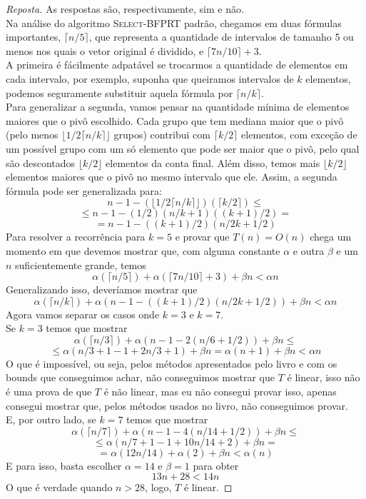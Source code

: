 \documentclass[12pt]{article}
\begin{document}
\begin{proof}[Reposta]
As respostas são, respectivamente, sim e não. \\
Na análise do algoritmo \textsc{Select-BFPRT} padrão, chegamos em duas fórmulas importantes, $\lceil n/5 \rceil$, que representa a quantidade de intervalos de tamanho 5 ou menos nos quais o vetor original é dividido, e $\lceil 7n/10 \rceil + 3$. \\ 
A primeira é fácilmente adpatável se trocarmos a quantidade de elementos em cada intervalo, por exemplo, suponha que queiramos intervalos de $k$ elementos, podemos seguramente substituir aquela fórmula por $\lceil n/k \rceil$. \\
Para generalizar a segunda, vamos pensar na quantidade mínima de elementos maiores que o pivô escolhido. Cada grupo que tem mediana maior que o pivô (pelo menos $\lfloor 1/2 \lceil n/k \rceil \rfloor$ grupos) contribui com $\lceil k/2 \rceil$ elementos, com exceção de um possível grupo com um só elemento que pode ser maior que o pivô, pelo qual são descontados $\lfloor k/2 \rfloor$ elementos da conta final. Além disso, temos mais $\lfloor k/2 \rfloor$ elementos maiores que o pivô no mesmo intervalo que ele. Assim, a segunda fórmula pode ser generalizada para:
$$ n - 1 - (\lfloor 1/2 \lceil n/k \rceil \rfloor)(\lceil k/2 \rceil) \leq $$
$$ \leq n - 1 - (1/2)(n/k+1)((k+1)/2) = $$
$$ = n - 1 - ((k+1)/2)(n/2k + 1/2) $$
Para resolver a recorrência para $k = 5$ e provar que $T(n) = O(n)$ chega um momento em que devemos mostrar que, com alguma constante $\alpha$ e outra $\beta$ e um $n$ suficientemente grande, temos \\
$$ \alpha(\lceil n/5 \rceil) + \alpha(\lceil 7n/10 \rceil + 3) + \beta n < \alpha n $$
Generalizando isso, deveríamos mostrar que 
$$ \alpha(\lceil n/k \rceil) + \alpha(n - 1 - ((k+1)/2)(n/2k + 1/2)) + \beta n < \alpha n $$
Agora vamos separar os casos onde $k = 3$ e $k = 7$. \\
Se $k = 3$ temos que mostrar
$$ \alpha(\lceil n/3 \rceil) + \alpha(n - 1 - 2(n/6 + 1/2)) + \beta n \leq $$ 
$$ \leq \alpha(n/3 + 1 - 1 + 2n/3 + 1) + \beta n = \alpha(n + 1) + \beta n < \alpha n $$
O que é impossível, ou seja, pelos métodos apresentados pelo livro e com os bounds que conseguimos achar, não conseguimos mostrar que $T$ é linear, isso não é uma prova de que $T$ é não linear, mas eu não consegui provar isso, apenas consegui mostrar que, pelos métodos usados no livro, não conseguimos provar. \\
E, por outro lado, se $k = 7$ temos que mostrar
$$ \alpha(\lceil n/7 \rceil) + \alpha(n - 1 - 4(n/14 + 1/2)) + \beta n \leq $$ 
$$ \leq \alpha(n/7 + 1 - 1 + 10n/14 + 2) + \beta n = $$ 
$$ = \alpha(12n/14) + \alpha(2) + \beta n < \alpha(n) $$
E para isso, basta escolher $\alpha = 14$ e $\beta = 1$ para obter
$$ 13n + 28 < 14n $$
O que é verdade quando $n > 28$, logo, $T$ é linear.
\end{proof}
\end{document}
